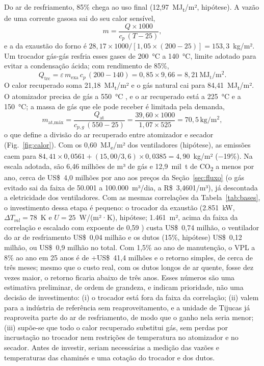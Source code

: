 \documentclass[10pt,a4paper,twocolumn]{article}
\newcommand{\MJt}{MJ\textsubscript{t}}
\newcommand{\MJe}{MJ\textsubscript{e}}
\newcommand{\COt}{CO\textsubscript{2}}
\newcommand{\un}[1]{\,\mathrm{#1}}
\begin{document}
Do ar de resfriamento, 85\% chega ao uso final (12,97~\MJt/m², hipótese). A vazão de uma corrente gasosa sai do seu calor sensível,
\begin{equation}
m = \frac{Q \times 1000}{c_p\,(T-25)}, \label{eq:mq}
\end{equation}
e a da exaustão do forno é $28{,}17 \times 1000/[1{,}05 \times (200-25)] = 153{,}3$~kg/m². Um trocador gás-gás resfria esses gases de 200~°C a 140~°C, limite adotado para evitar a condensação ácida; com rendimento de 85\%,
\begin{equation}
Q_{\text{trc}} = \varepsilon\, m_{\text{exa}}\, c_p\,(200-140) = 0{,}85 \times 9{,}66 = 8{,}21\un{MJ_t/m^2}. \label{eq:qtrc}
\end{equation}
O calor recuperado soma 21,18~\MJt/m² e o gás natural cai para 84,41~\MJt/m². O atomizador precisa de gás a 550~°C \cite{della2012}, e o ar recuperado está a 225~°C e a 150~°C; a massa de gás que ele pode receber é limitada pela demanda,
\begin{equation}
m_{\text{at,máx}} = \frac{Q_{\text{at}}}{c_{p,g}\,(550-25)} = \frac{39{,}60\times 1000}{1{,}07 \times 525} = 70{,}5\un{kg/m^2}, \label{eq:matmax}
\end{equation}
o que define a divisão do ar recuperado entre atomizador e secador (Fig.~\ref{fig:calor}). Com os 0,60~\MJe/m² dos ventiladores (hipótese), as emissões caem para $84{,}41 \times 0{,}0561 + (15{,}00/3{,}6) \times 0{,}0385 = 4{,}90$~kg/m² (−19\%). Na escala adotada, são 6,46 milhões de m³ de gás e 12,9~mil~t de \COt{} a menos por ano, cerca de US\$~4,0 milhões por ano aos preços da Seção~\ref{sec:fluxo} (o gás evitado sai da faixa de 50.001 a 100.000~m³/dia, a R\$~3,4601/m³), já descontada a eletricidade dos ventiladores. Com as mesmas correlações da Tabela~\ref{tab:bases}, o investimento dessa etapa é pequeno: o trocador da exaustão (2.851~kW, $\Delta T_{ml} = 78$~K e $U = 25$~W/(m²·K), hipótese; 1.461~m², acima da faixa da correlação e escalado com expoente de 0,59 \cite{turton2018}) custa US\$~0,74 milhão, o ventilador do ar de resfriamento US\$~0,04 milhão e os dutos (15\%, hipótese) US\$~0,12 milhão, ou US\$~0,9 milhão no total. Com 1,5\% ao ano de manutenção, o VPL a 8\% ao ano em 25 anos é de +US\$~41,4 milhões e o retorno simples, de cerca de três meses; mesmo que o custo real, com os dutos longos de ar quente, fosse dez vezes maior, o retorno ficaria abaixo de três anos. Esses números são uma estimativa preliminar, de ordem de grandeza, e indicam prioridade, não uma decisão de investimento: (i) o trocador está fora da faixa da correlação; (ii) valem para a indústria de referência sem reaproveitamento, e a unidade de Tijucas já reaproveita parte do ar de resfriamento, de modo que o ganho nela seria menor; (iii) supõe-se que todo o calor recuperado substitui gás, sem perdas por incrustação no trocador nem restrições de temperatura no atomizador e no secador. Antes de investir, seriam necessárias a medição das vazões e temperaturas das chaminés e uma cotação do trocador e dos dutos.
\end{document}

